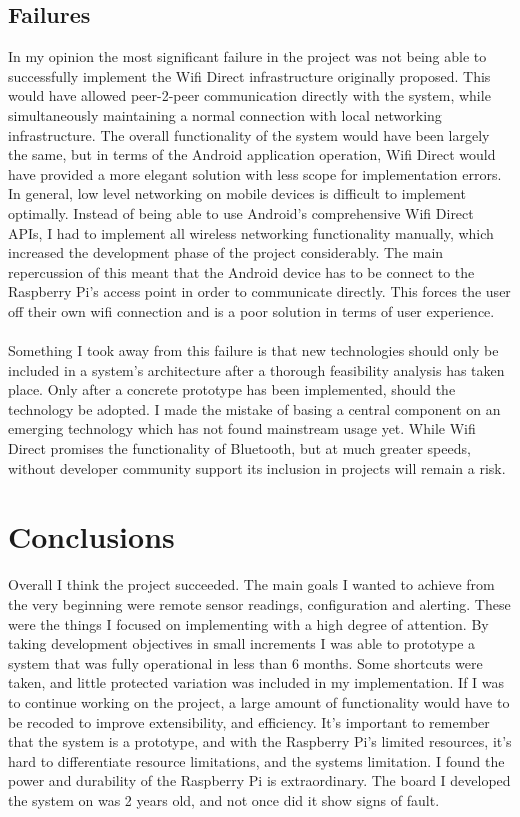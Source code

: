 \documentclass{article}
\begin{document}
\subsection{Failures}
In my opinion the most significant failure in the project was not being able to successfully implement the Wifi Direct infrastructure originally proposed. This would have allowed peer-2-peer communication directly with the system, while simultaneously maintaining a normal connection with local networking infrastructure. The overall functionality of the system would have been largely the same, but in terms of the Android application operation, Wifi Direct would have provided a more elegant solution with less scope for implementation errors. In general, low level networking on mobile devices is difficult to implement optimally. Instead of being able to use Android\rq s comprehensive Wifi Direct APIs, I had to implement all wireless networking functionality manually, which increased the development phase of the project considerably. The main repercussion of this meant that the Android device has to be connect to the Raspberry Pi\rq s access point in order to communicate directly. This forces the user off their own wifi connection and is a poor solution in terms of user experience. \\\\
Something I took away from this failure is that new technologies should only be included in a system\rq s architecture after a thorough feasibility analysis has taken place. Only after a concrete prototype has been implemented, should the technology be adopted. I made the mistake of basing a central component on an emerging technology which has not found mainstream usage yet. While Wifi Direct promises the functionality of Bluetooth, but at much greater speeds, without developer community support its inclusion in projects will remain a risk. 

\newpage
\section{Conclusions}
Overall I think the project succeeded. The main goals I wanted to achieve from the very beginning were remote sensor readings, configuration and alerting. These were the things I focused on implementing with a high degree of attention. By taking development objectives in small increments I was able to prototype a system that was fully operational in less than 6 months. Some shortcuts were taken, and little protected variation was included in my implementation. If I was to continue working on the project, a large amount of functionality would have to be recoded to improve extensibility, and efficiency. It’s important to remember that the system is a prototype, and with the Raspberry Pi\rq s limited resources, it\rq s hard to differentiate resource limitations, and the systems limitation. I found the power and durability of the Raspberry Pi is extraordinary. The board I developed the system on was 2 years old, and not once did it show signs of fault. 
\end{document}
